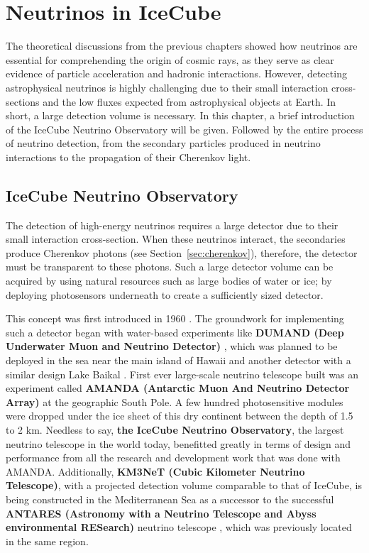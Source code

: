\setchapterpreamble[u]{\margintoc}
\chapter{Neutrinos in IceCube} 
The theoretical discussions from the previous chapters showed how neutrinos are essential for comprehending the origin of cosmic rays, as they serve as clear evidence of particle acceleration and hadronic interactions. However, detecting astrophysical neutrinos is highly challenging due to their small interaction cross-sections and the low fluxes expected from astrophysical objects at Earth. In short, a large detection volume is necessary. In this chapter, a brief introduction of the IceCube Neutrino Observatory will be given. Followed by the entire process of neutrino detection, from the secondary particles produced in neutrino interactions to the propagation of their Cherenkov light.


\section{IceCube Neutrino Observatory}
\label{sec:IC_detector}
The detection of high-energy neutrinos requires a large detector due to their small interaction cross-section. When these neutrinos interact, the secondaries produce Cherenkov photons (see Section~\ref{sec:cherenkov}), therefore, the detector must be transparent to these photons. Such a large detector volume can be acquired by using natural resources such as large bodies of water or ice; by deploying photosensors underneath to create a sufficiently sized detector.\par

This concept was first introduced in 1960 . The groundwork for implementing such a detector began with water-based experiments like \textbf{DUMAND (Deep Underwater Muon and Neutrino Detector)} , which was planned to be deployed in the sea near the main island of Hawaii and another detector with a similar design Lake Baikal . First ever large-scale neutrino telescope built was an experiment called \textbf{AMANDA (Antarctic Muon And Neutrino Detector Array)}  at the geographic South Pole. A few hundred photosensitive modules were dropped under the ice sheet of this dry continent between the depth of 1.5 to 2 km. Needless to say, \textbf{the IceCube Neutrino Observatory}, the largest neutrino telescope in the world today, benefitted greatly in terms of design and performance from all the research and development work that was done with AMANDA. Additionally, \textbf{KM3NeT (Cubic Kilometer Neutrino Telescope)}, with a projected detection volume comparable to that of IceCube, is being constructed in the Mediterranean Sea  as a successor to the successful \textbf{ANTARES (Astronomy with a Neutrino Telescope and Abyss environmental RESearch)} neutrino telescope , which was previously located in the same region.
\newpage

